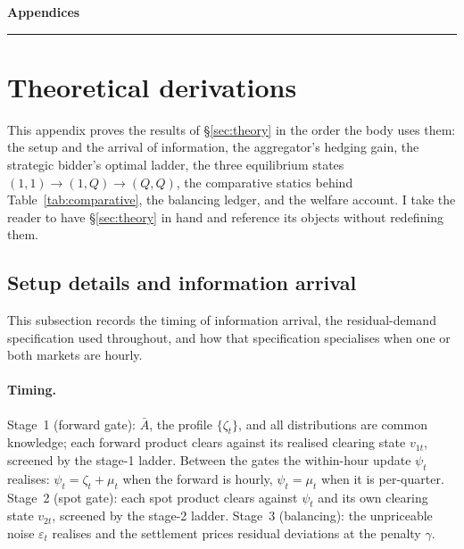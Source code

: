 \documentclass[11pt,a4paper]{article}
\theoremstyle{definition}
\theoremstyle{remark}
\theoremstyle{plain}
\begin{document}
\newpage




\newpage


\appendix


\begin{center}
  {\Large\bfseries\color{cemfiblue} Appendices}\\[5pt]
  {\color{cemfiblue}\rule{0.16\textwidth}{1pt}}
\end{center}
\vspace{0.3\baselineskip}

\section{Theoretical derivations}\label{app:derivations}

This appendix proves the results of \S\ref{sec:theory} in the order the body uses them: the setup and the arrival of information, the aggregator's hedging gain, the strategic bidder's optimal ladder, the three equilibrium states $(1,1) \to (1,Q) \to (Q,Q)$, the comparative statics behind Table~\ref{tab:comparative}, the balancing ledger, and the welfare account. I take the reader to have \S\ref{sec:theory} in hand and reference its objects without redefining them.

\subsection{Setup details and information arrival}\label{app:setup}

This subsection records the timing of information arrival, the \citeauthor{ito_reguant_2016} residual-demand specification used throughout, and how that specification specialises when one or both markets are hourly.

\paragraph{Timing.} Stage~1 (forward gate): $\bar A$, the profile $\{\zeta_t\}$, and all distributions are common knowledge; each forward product clears against its realised clearing state $v_{1t}$, screened by the stage-1 ladder. Between the gates the within-hour update $\psi_t$ realises: $\psi_t = \zeta_t + \mu_t$ when the forward is hourly, $\psi_t = \mu_t$ when it is per-quarter. Stage~2 (spot gate): each spot product clears against $\psi_t$ and its own clearing state $v_{2t}$, screened by the stage-2 ladder. Stage~3 (balancing): the unpriceable noise $\varepsilon_t$ realises and the settlement prices residual deviations at the penalty $\gamma$.
\end{document}
